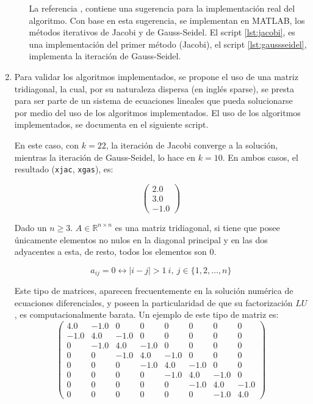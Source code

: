 \documentclass[11pt, spanish]{article}
\begin{document}
\begin{enumerate}
\begin{itemize}
La referencia \cite{cheney2012numerical}, contiene una sugerencia para la implementación real del algoritmo. Con base en esta sugerencia, se implementan en \textsc{MATLAB}, los métodos iterativos de Jacobi y de Gauss-Seidel. El script \ref{lst:jacobi}, es una implementación del primer método (Jacobi), el script \ref{lst:gaussseidel}, implementa la iteración de Gauss-Seidel.

\end{itemize}

\item Para validar los algoritmos implementados, se propone el uso de una matriz tridiagonal, la cual, por su naturaleza dispersa (en inglés sparse), se presta para ser parte de un sistema de ecuaciones lineales que pueda solucionarse por medio del uso de los algoritmos implementados. El uso de los algoritmos implementados, se documenta en el siguiente script.



En este caso, con $k = 22$, la iteración de Jacobi converge a la solución, mientras la iteración de Gauss-Seidel, lo hace en $k = 10$. En ambos casos, el resultado (\texttt{xjac}, \texttt{xgas}), es:

$$\left(\begin{array}{c} 2.0\\ 3.0\\ -1.0 \end{array}\right)$$  

Dado un $n \geq 3$. $A \in \mathbb{R}^{n \times n}$ es una matriz tridiagonal, si tiene que posee únicamente elementos no nulos en la diagonal principal y en las dos adyacentes a esta, de resto, todos los elementos son $0$.

$$a_{ij} = 0 \leftrightarrow |i - j| > 1\ i,\ j \in \{1,2,\dots,n\}$$

Este tipo de matrices, aparecen frecuentemente en la solución numérica de ecuaciones diferenciales, y poseen la particularidad de que su factorización $LU$, es computacionalmente barata. Un ejemplo de este tipo de matriz es:\\

$$\left(\begin{array}{cccccccc} 4.0 & -1.0 & 0 & 0 & 0 & 0 & 0 & 0\\ -1.0 & 4.0 & -1.0 & 0 & 0 & 0 & 0 & 0\\ 0 & -1.0 & 4.0 & -1.0 & 0 & 0 & 0 & 0\\ 0 & 0 & -1.0 & 4.0 & -1.0 & 0 & 0 & 0\\ 0 & 0 & 0 & -1.0 & 4.0 & -1.0 & 0 & 0\\ 0 & 0 & 0 & 0 & -1.0 & 4.0 & -1.0 & 0\\ 0 & 0 & 0 & 0 & 0 & -1.0 & 4.0 & -1.0\\ 0 & 0 & 0 & 0 & 0 & 0 & -1.0 & 4.0 \end{array}\right)
$$\\


\end{enumerate}
\end{document}
